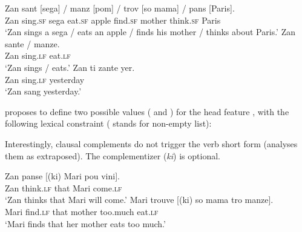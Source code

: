 \begin{exe}
\ex \begin{xlist}
\ex 
\gll Zan sant             [sega]         /  manz            [pom]           /  trov             [so mama] / pans [Paris]. \\
     Zan sing.\textsc{sf} \spacebr{}sega {} eat.\textsc{sf} \spacebr{}apple {} find.\textsc{sf} \spacebr{}\POSS{} mother {} think.\textsc{sf} \spacebr{}Paris \\
\glt `Zan sings a sega / eats an apple / finds his mother / thinks about Paris.'	
\ex 
\gll Zan sante / manze.\\
     Zan sing.\textsc{lf} {} eat.\textsc{lf}\\
\glt `Zan sings / eats.'
\ex 
\gll Zan ti zante yer. \\
Zan  \PRF{} sing.\textsc{lf} yesterday\\
\glt `Zan sang yesterday.'
\end{xlist}
\end{exe}


\citet[]{Henri2010} proposes to define two possible values ( and ) for the head
feature \vform, with the following lexical constraint ( stands for non-empty list):

\ea
\label{sf-constraint}
\avm{
[vform & sf]} \impl 
{}
\z
Interestingly, clausal complements do not trigger the verb short form (\citet{Henri2010}\addpages analyses them as extraposed). The complementizer (\emph{ki}) is optional.

\eal
\ex 
\gll Zan panse             [(ki)               Mari pou    vini].\\
     Zan think.\textsc{lf} \hphantom{[(}that Mari \FUT{} come.\textsc{lf}\\
\glt `Zan thinks that Mari will come.'
\ex 
\gll Mari trouve           [(ki)                so      mama   tro      manze].\\
     Mari find.\textsc{lf} \hphantom{[(}that  \POSS{} mother too.much eat.\textsc{lf}\\
\glt `Mari finds that her mother eats too much.'
\zl

